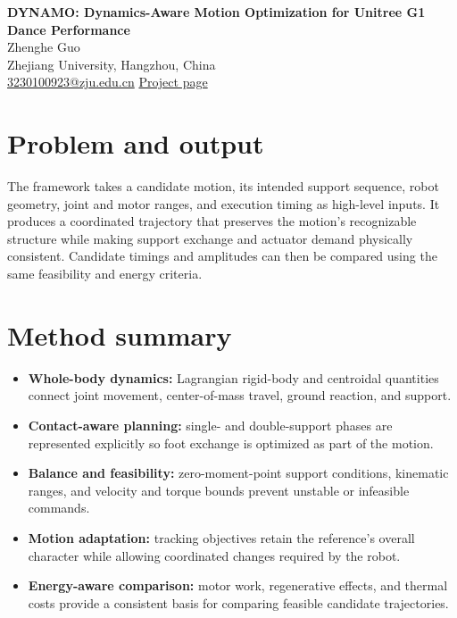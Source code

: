 \documentclass[10pt,letterpaper]{article}
\begin{document}
\begin{center}
{\LARGE\bfseries DYNAMO: Dynamics-Aware Motion Optimization for Unitree G1 Dance Performance}\\[7pt]
{\large Zhenghe Guo}\\[2pt]
Zhejiang University, Hangzhou, China\\[2pt]
\href{mailto:3230100923@zju.edu.cn}{3230100923@zju.edu.cn} \quad
\href{https://styokuok.github.io/main/projects/dynamo/}{Project page}
\end{center}

\begin{abstract}
DYNAMO is a motion-planning framework for translating an expressive dance reference into a stable and executable whole-body trajectory for a Unitree G1 humanoid. Visually plausible reference motion does not automatically satisfy contact, balance, joint, motor, or energy constraints. DYNAMO therefore treats motion adaptation as a coupled dynamics and trajectory-optimization problem rather than direct pose replay. This public brief summarizes the problem formulation, functional components, and visualization without releasing the competition solver or tuned implementation details.
\end{abstract}

\section*{Problem and output}
The framework takes a candidate motion, its intended support sequence, robot geometry, joint and motor ranges, and execution timing as high-level inputs. It produces a coordinated trajectory that preserves the motion's recognizable structure while making support exchange and actuator demand physically consistent. Candidate timings and amplitudes can then be compared using the same feasibility and energy criteria.

\section*{Method summary}
\begin{itemize}
  \item \textbf{Whole-body dynamics:} Lagrangian rigid-body and centroidal quantities connect joint movement, center-of-mass travel, ground reaction, and support.
  \item \textbf{Contact-aware planning:} single- and double-support phases are represented explicitly so foot exchange is optimized as part of the motion.
  \item \textbf{Balance and feasibility:} zero-moment-point support conditions, kinematic ranges, and velocity and torque bounds prevent unstable or infeasible commands.
  \item \textbf{Motion adaptation:} tracking objectives retain the reference's overall character while allowing coordinated changes required by the robot.
  \item \textbf{Energy-aware comparison:} motor work, regenerative effects, and thermal costs provide a consistent basis for comparing feasible candidate trajectories.
\end{itemize}
\end{document}
